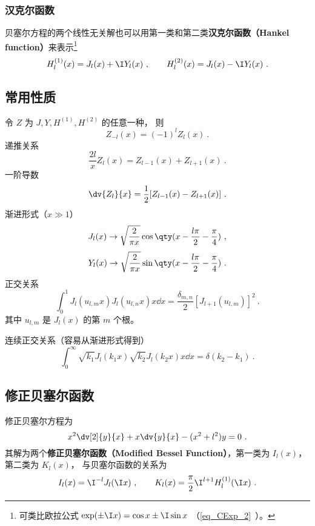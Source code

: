\subsubsection{汉克尔函数}
贝塞尔方程的两个线性无关解也可以用第一类和第二类\textbf{汉克尔函数（Hankel function）}来表示\footnote{可类比欧拉公式 $\exp(\pm\I x) = \cos x \pm \I\sin x$ （\autoref{eq_CExp_2}~）。}
\begin{equation}
H_l ^{(1)}(x) = J_l(x) + \I Y_l(x)~,
\qquad
H_l ^{(2)}(x) = J_l(x) - \I Y_l(x)~.
\end{equation}

\subsection{常用性质}
令 $Z$ 为 $J, Y, H^{(1)}, H^{(2)}$ 的任意一种， 则
\begin{equation}
Z_{-l}(x) = (-1)^l Z_l(x)~.
\end{equation}
递推关系
\begin{equation}
\frac{2l}{x} Z_l(x) = Z_{l -1}(x) + Z_{l+1}(x)~.
\end{equation}
一阶导数
\begin{equation}
\dv{Z_l}{x} = \frac12 [Z_{l  - 1}(x) - Z_{l +1}(x)]~.
\end{equation}
渐进形式（$x \gg 1$）
\begin{equation}
J_l(x) \to \sqrt{\frac{2}{\pi x}} \cos\qty(x - \frac{l\pi}{2} - \frac{\pi}{4})~,
\end{equation}
\begin{equation}
Y_l(x) \to \sqrt{\frac{2}{\pi x}} \sin\qty(x - \frac{l\pi}{2} - \frac{\pi}{4})~.
\end{equation}
正交关系
\begin{equation}
\int_0^1 J_l (u_{l ,m} x) J_l (u_{l ,n} x) x \dd{x} = \frac{\delta_{m,n}}{2}[J_{l + 1} (u_{l ,m})]^2~.
\end{equation}
其中 $u_{l, m}$ 是 $J_l(x)$ 的第 $m$ 个根。

连续正交关系（容易从渐进形式得到）
\begin{equation}
\int_0^\infty \sqrt{k_1} J_l (k_1 x) \sqrt{k_2}J_l (k_2 x) x \dd{x} = \delta(k_2 - k_1)~.
\end{equation}

\subsection{修正贝塞尔函数}
修正贝塞尔方程为
\begin{equation}
x^2 \dv[2]{y}{x} + x \dv{y}{x} - (x^2 + l ^2)y = 0~.
\end{equation}
其解为两个\textbf{修正贝塞尔函数（Modified Bessel Function）}，第一类为 $I_l(x)$，  第二类为 $K_l(x)$，  与贝塞尔函数的关系为
\begin{equation}\label{eq_Bessel_2}
I_l(x) = \I^{-l} J_l(\I x)~,
\qquad
K_l(x) = \frac{\pi}{2} \I^{l  + 1} H_l ^{(1)}(\I x)~.
\end{equation}
